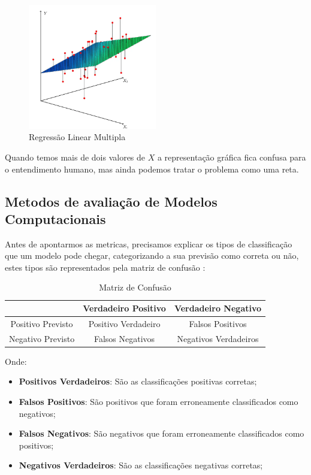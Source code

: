 \documentclass[
	12pt,				%
	openright,			%
	oneside,			%
	a4paper,			%
	english,			%
	brazil				%
	]{abntex2}
\begin{document}
\begin{figure}[H]
    \centering
    \caption{\label{Regressão Linear Multipla}Regressão Linear Multipla}
    \includegraphics[width=0.50\textwidth]{../Imgs/reg_linear_multipla.png}
\end{figure}

Quando temos mais de dois valores de $X$ a representação gráfica fica confusa para o entendimento humano,
mas ainda podemos tratar o problema como uma reta.

\subsection{Metodos de avaliação de Modelos Computacionais}

Antes de apontarmos as metricas, precisamos explicar os tipos de classificação que um modelo pode chegar,
categorizando a sua previsão como correta ou não, estes tipos são representados pela matriz de confusão
\cite{acuracia_matriz}:

\begin{table}[H]
	\centering
	\caption{\label{Matriz de Confusão}Matriz de Confusão}
	\begin{tabular}{|c|c|c|}
	\hline
					  & Verdadeiro Positivo & Verdadeiro Negativo   \\ \hline
	Positivo Previsto & Positivo Verdadeiro & Falsos Positivos      \\ \hline
	Negativo Previsto & Falsos Negativos    & Negativos Verdadeiros \\ \hline
	\end{tabular}
\end{table}

Onde:
\begin{itemize}
	\item \textbf{Positivos Verdadeiros}: São as classificações positivas corretas;
	\item \textbf{Falsos Positivos}: São positivos que foram erroneamente classificados como negativos;
	\item \textbf{Falsos Negativos}: São negativos que foram erroneamente classificados como positivos;
	\item \textbf{Negativos Verdadeiros}: São as classificações negativas corretas;
\end{itemize}
\end{document}
